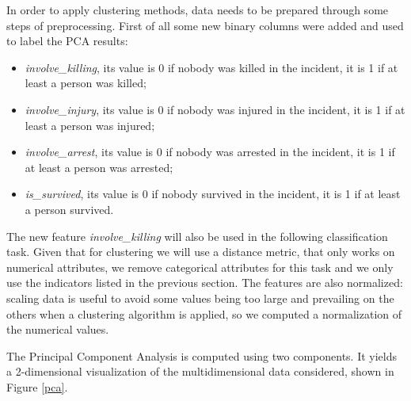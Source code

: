 \documentclass[10pt,a4paper]{report}
\begin{document}
In order to apply clustering methods, data needs to be prepared through some steps of preprocessing.
First of all some new binary columns were added and used to label the PCA results:
\begin{itemize}
	\item \textit{involve\_killing}, its value is 0 if nobody was killed in the incident, it is 1 if at least a person was killed;
	\item \textit{involve\_injury}, its value is 0 if nobody was injured in the incident, it is 1 if at least a person was injured;
	\item \textit{involve\_arrest}, its value is 0 if nobody was arrested in the incident, it is 1 if at least a person was arrested;
	\item \textit{is\_survived}, its value is 0 if nobody survived in the incident, it is 1 if at least a person survived.
\end{itemize}
The new feature \textit{involve\_killing} will also be used in the following classification task.
Given that for clustering we will use a distance metric, that only works on numerical attributes, we remove categorical attributes for this task and we only use the indicators listed in the previous section.
The features are also normalized: scaling data is useful to avoid some values being too large and prevailing on the others when a clustering algorithm is applied, so we computed a normalization of the numerical values.

The Principal Component Analysis is computed using two components.
It yields a 2-dimensional visualization of the multidimensional data considered, shown in Figure \ref{pca}.
\end{document}
